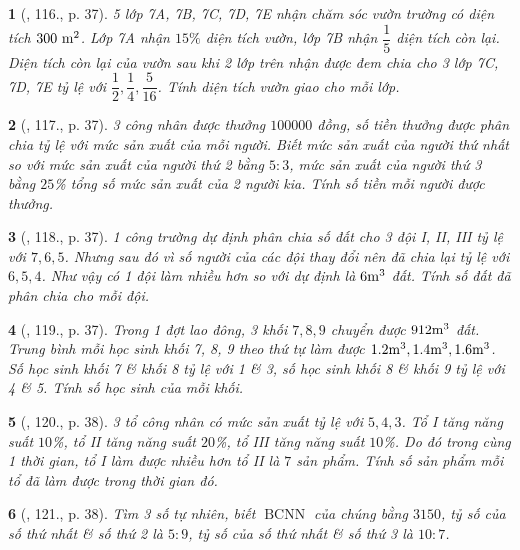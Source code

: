 \documentclass{article}
\newtheorem{baitoan}{}
\begin{document}
\begin{baitoan}[\cite{Binh_Toan_7_tap_1}, 116., p. 37]
	5 lớp 7A, 7B, 7C, 7D, 7E nhận chăm sóc vườn trường có diện tích $\rm300\ m^2$. Lớp 7A nhận $15\%$ diện tích vườn, lớp 7B nhận $\dfrac{1}{5}$ diện tích còn lại. Diện tích còn lại của vườn sau khi 2 lớp trên nhận được đem chia cho 3 lớp 7C, 7D, 7E tỷ lệ với $\dfrac{1}{2},\dfrac{1}{4},\dfrac{5}{16}$. Tính diện tích vườn giao cho mỗi lớp.
\end{baitoan}

\begin{baitoan}[\cite{Binh_Toan_7_tap_1}, 117., p. 37]
	3 công nhân được thưởng $100000$ đồng, số tiền thưởng được phân chia tỷ lệ với mức sản xuất của mỗi người. Biết mức sản xuất của người thứ nhất so với mức sản xuất của người thứ 2 bằng $5:3$, mức sản xuất của người thứ 3 bằng $25$\% tổng số mức sản xuất của 2 người kia. Tính số tiền mỗi người được thưởng.
\end{baitoan}

\begin{baitoan}[\cite{Binh_Toan_7_tap_1}, 118., p. 37]
	1 công trường dự định phân chia số đất cho 3 đội I, II, III tỷ lệ với $7,6,5$. Nhưng sau đó vì số người của các đội thay đổi nên đã chia lại tỷ lệ với $6,5,4$. Như vậy có 1 đội làm nhiều hơn so với dự định là $\rm6m^3$ đất. Tính số đất đã phân chia cho mỗi đội.
\end{baitoan}

\begin{baitoan}[\cite{Binh_Toan_7_tap_1}, 119., p. 37]
	Trong 1 đợt lao đông, 3 khối $7,8,9$ chuyển được $\rm912m^3$ đất. Trung bình mỗi học sinh khối 7, 8, 9 theo thứ tự làm được $\rm1.2m^3,1.4m^3,1.6m^3$. Số học sinh khối 7 \& khối 8 tỷ lệ với 1 \& 3, số học sinh khối 8 \& khối 9 tỷ lệ với 4 \& 5. Tính số học sinh của mỗi khối.
\end{baitoan}
	
\begin{baitoan}[\cite{Binh_Toan_7_tap_1}, 120., p. 38]
	3 tổ công nhân có mức sản xuất tỷ lệ với $5,4,3$. Tổ I tăng năng suất $10$\%, tổ II tăng năng suất $20$\%, tổ III tăng năng suất $10$\%. Do đó trong cùng 1 thời gian, tổ I làm được nhiều hơn tổ II là $7$ sản phẩm. Tính số sản phẩm mỗi tổ đã làm được trong thời gian đó.
\end{baitoan}

\begin{baitoan}[\cite{Binh_Toan_7_tap_1}, 121., p. 38]
	Tìm 3 số tự nhiên, biết $\operatorname{BCNN}$ của chúng bằng $3150$, tỷ số của số thứ nhất \& số thứ 2 là $5:9$, tỷ số của số thứ nhất \& số thứ 3 là $10:7$.
\end{baitoan}
\end{document}
